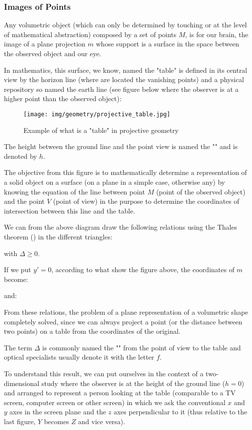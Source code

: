 	\pagebreak
	\subsubsection{Images of Points}
	Any volumetric object (which can only be determined by touching or at the level of mathematical abstraction) composed by a set of points $M$, is for our brain, the image of a plane projection $m$ whose support is a surface in the space between the observed object and our eye.
	
	In mathematics, this surface, we know, named the "table" is defined in its central view by the horizon line (where are located the vanishing points) and a physical repository so named the earth line (see figure below where the observer is at a higher point than the observed object):
	\begin{figure}[H]
		\centering
		\texttt{[image: img/geometry/projective\_table.jpg]}
		\caption{Example of what is a "table" in projective geometry}
	\end{figure}
	The height between the ground line and the point view is named the "" and is denoted by $h$.
	
	The objective from this figure is to mathematically determine a representation of a solid object on a surface (on a plane in a simple case, otherwise any) by knowing the equation of the line between point $M$ (point of the observed object) and the point $V$ (point of view) in the purpose to determine the coordinates of intersection between this line and the table.

	We can from the above diagram draw the following relations using the Thales theorem () in the different triangles:
	
	with $\Delta\geq 0$.

	If we put $y'=0$, according to what show the figure above, the coordinates of $m$ become:
	
	and:
	
	From these relations, the problem of a plane representation of a volumetric shape completely solved, since we can always project a point (or the distance between two points) on a table from the coordinates of the original.
	
	The term $\Delta$ is commonly named the "" from the point of view to the table and optical specialists usually denote it with the letter $f$.

	To understand this result, we can put ourselves in the context of a two-dimensional study where the observer is at the height of the ground line ($h = 0$) and arranged to represent a person looking at the table (comparable to a TV screen, computer screen or other screen) in which we ask the conventional $x$ and $y$ axes in the screen plane and the $z$ axes perpendicular to it (thus relative to the last figure, $Y$ becomes $Z$ and vice versa).


